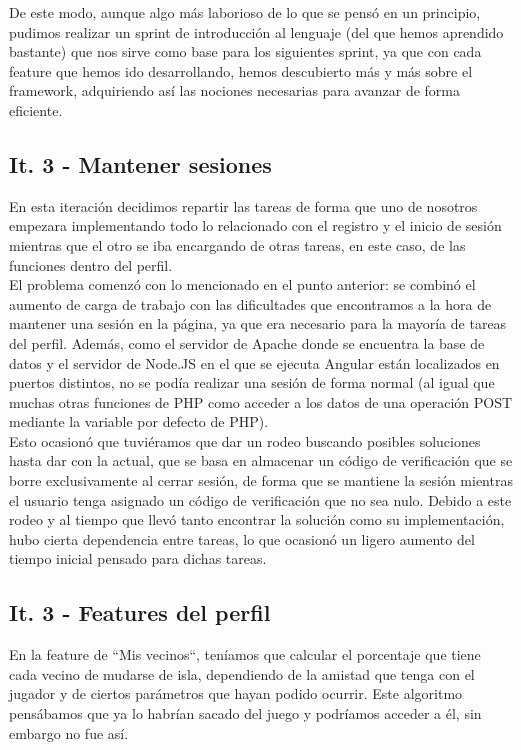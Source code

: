 De este modo, aunque algo más laborioso de lo que se pensó en un principio, pudimos realizar un sprint de introducción al lenguaje (del que hemos aprendido bastante) que nos sirve como base para los siguientes sprint, ya que con cada feature que hemos ido desarrollando, hemos descubierto más y más sobre el framework, adquiriendo así las nociones necesarias para avanzar de forma eficiente.

\subsection{It. 3 - Mantener sesiones}

En esta iteración decidimos repartir las tareas de forma que uno de nosotros empezara implementando todo lo relacionado con el registro y el inicio de sesión mientras que el otro se iba encargando de otras tareas, en este caso, de las funciones dentro del perfil.\\

El problema comenzó con lo mencionado en el punto anterior: se combinó el aumento de carga de trabajo con las dificultades que encontramos a la hora de mantener una sesión en la página, ya que era necesario para la mayoría de tareas del perfil. Además, como el servidor de Apache donde se encuentra la base de datos y el servidor de Node.JS en el que se ejecuta Angular están localizados en puertos distintos, no se podía realizar una sesión de forma normal (al igual que muchas otras funciones de PHP como acceder a los datos de una operación POST mediante la variable por defecto de PHP).\\

Esto ocasionó que tuviéramos que dar un rodeo buscando posibles soluciones hasta dar con la actual, que se basa en almacenar un código de verificación que se borre exclusivamente al cerrar sesión, de forma que se mantiene la sesión mientras el usuario tenga asignado un código de verificación que no sea nulo. Debido a este rodeo y al tiempo que llevó tanto encontrar la solución como su implementación, hubo cierta dependencia entre tareas, lo que ocasionó un ligero aumento del tiempo inicial pensado para dichas tareas.

\subsection{It. 3 - Features del perfil}

En la feature de ``Mis vecinos``, teníamos que calcular el porcentaje que tiene cada vecino de mudarse de isla, dependiendo de la amistad que tenga con el jugador y de ciertos parámetros que hayan podido ocurrir. Este algoritmo pensábamos que ya lo habrían sacado del juego y podríamos acceder a él, sin embargo no fue así.\\

